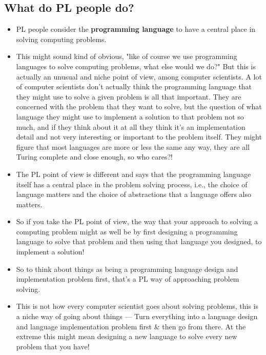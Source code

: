 \documentclass[11pt]{article}
\begin{document}
\subsection*{What do PL people do?}
\begin{itemize}
  \item PL people consider the \textbf{programming language} to have a central place in solving computing problems. 
  
  \item This might sound kind of obvious, "like of course we use programming languages to solve computing problems, what else would we do?" But this is actually an unusual and niche point of view, among computer scientists. A lot of computer scientists don't actually think the programming language that they might use to solve a given problem is all that important. They are concerned with the problem that they want to solve, but the question of what language they might use to implement a solution to that problem not so much, and if they think about it at all they think it's an implementation detail and not very interesting or important to the problem itself.
  They might figure that most languages are more or less the same any way, they are all Turing complete and close enough, so who cares?!
  
  \item The PL point of view is different and says that the programming language itself has a central place in the problem solving process, i.e., the choice of language matters and the choice of abstractions that a language offers also matters.

  \item So if you take the PL point of view, the way that your approach to solving a computing problem might as well be by first designing a programming language to solve that problem and then using that language you designed, to implement a solution!

  \item So to think about things as being a programming language design and implementation problem first, that's a PL way of approaching problem solving.
  
  \item This is not how every computer scientist goes about solving problems, this is a niche way of going about things --- Turn everything into a language design and language implementation problem first \& then go from there. At the extreme this might mean designing a new language to solve every new problem that you have!


\end{itemize}
\end{document}
